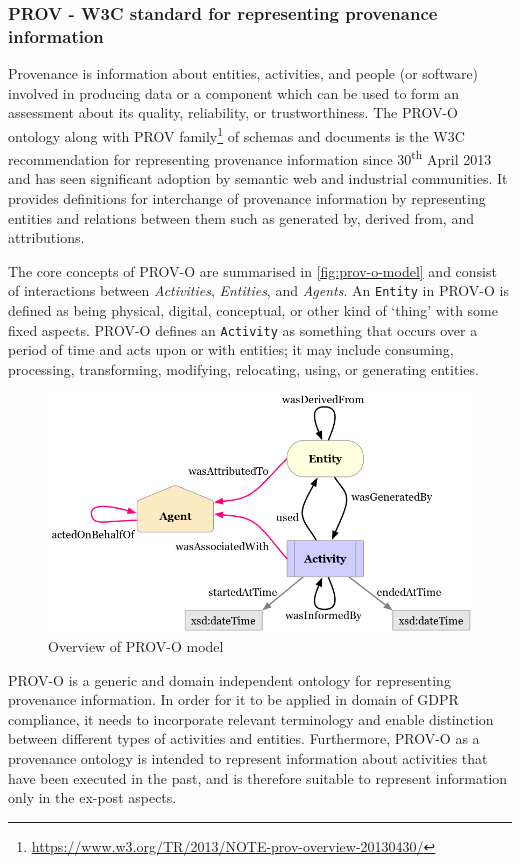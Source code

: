 \subsubsection{PROV - W3C standard for representing provenance information}
Provenance is information about entities, activities, and people (or software)
involved in producing data or a component which can be used to form an
assessment about its quality, reliability, or trustworthiness. The PROV-O ontology \cite{lebo_prov-o_2013} along with PROV family\footnote{\url{https://www.w3.org/TR/2013/NOTE-prov-overview-20130430/}} of schemas and documents is the W3C recommendation for representing provenance information since 30\textsuperscript{th} April 2013 and has seen significant adoption by semantic web and industrial communities.
It provides definitions for interchange of provenance information by representing entities
and relations between them such as generated by, derived from, and attributions.

The core concepts of PROV-O are summarised in \autoref{fig:prov-o-model} and consist of interactions between \textit{Activities}, \textit{Entities}, and \textit{Agents}.
An \texttt{Entity} in PROV-O is defined as being physical, digital, conceptual, or other
kind of `thing' with some fixed aspects. PROV-O defines an \texttt{Activity} as something
that occurs over a period of time and acts upon or with entities; it may include
consuming, processing, transforming, modifying, relocating, using, or generating
entities.
\begin{figure}[htbp]
    \centering
    \includegraphics[width=0.8\linewidth]{img/prov-o-model.png}
    \caption{Overview of PROV-O model \cite{lebo_prov-o_2013}}
    \label{fig:prov-o-model}
\end{figure}

PROV-O is a generic and domain independent ontology for representing provenance information.
In order for it to be applied in domain of GDPR compliance, it needs to incorporate relevant terminology and enable distinction between different types of activities and entities.
Furthermore, PROV-O as a provenance ontology is intended to represent information about activities that have been executed in the past, and is therefore suitable to represent information only in the ex-post aspects.

